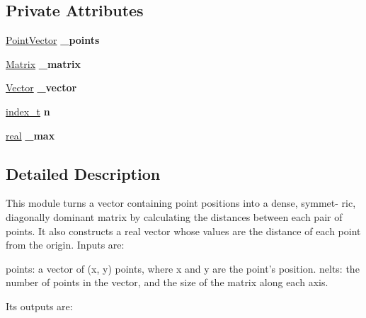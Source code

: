 \subsection*{Private Attributes}
\begin{CompactItemize}
\item 
\hypertarget{class_point_distances_a6640fdeda32580a760309f564f8ac9d}{
\hyperlink{class_point}{PointVector} \textbf{\_\-points}}
\label{class_point_distances_a6640fdeda32580a760309f564f8ac9d}

\item 
\hypertarget{class_point_distances_3044927709dad1b9a94784f077d83190}{
\hyperlink{cowichan_8hpp_3fb46f939e55c239fbc95656fc0f3399}{Matrix} \textbf{\_\-matrix}}
\label{class_point_distances_3044927709dad1b9a94784f077d83190}

\item 
\hypertarget{class_point_distances_3233cd7ba2cdb8a51ceadce064569c7d}{
\hyperlink{cowichan_8hpp_02bc1553e241b9b33408482658b3c355}{Vector} \textbf{\_\-vector}}
\label{class_point_distances_3233cd7ba2cdb8a51ceadce064569c7d}

\item 
\hypertarget{class_point_distances_633e1a7fb762471b9a4806d52e024fcc}{
\hyperlink{cowichan_8hpp_5b04577d5d21124855deaad298595371}{index\_\-t} \textbf{n}}
\label{class_point_distances_633e1a7fb762471b9a4806d52e024fcc}

\item 
\hypertarget{class_point_distances_5aa37e9525054b926bb2ce5c6bb515a8}{
\hyperlink{cowichan_8hpp_4d521b2c54a1f6312cc8fa04827eaf98}{real} \textbf{\_\-max}}
\label{class_point_distances_5aa37e9525054b926bb2ce5c6bb515a8}

\end{CompactItemize}


\subsection{Detailed Description}
This module turns a vector containing point positions into a dense, symmet- ric, diagonally dominant matrix by calculating the distances between each pair of points. It also constructs a real vector whose values are the distance of each point from the origin. Inputs are:

points: a vector of (x, y) points, where x and y are the point’s position. nelts: the number of points in the vector, and the size of the matrix along each axis.

Its outputs are:


